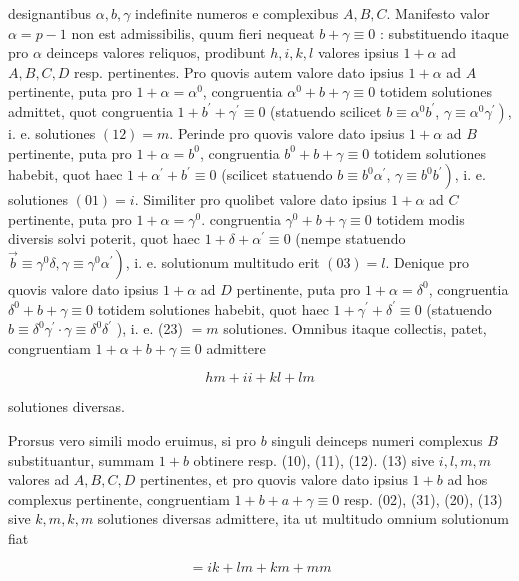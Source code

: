 \documentclass[10pt]{article}
\begin{document}
designantibus \(\alpha, b, \gamma\) indefinite numeros e complexibus \(A, B, C\). Manifesto valor \(\alpha=p-1\) non est admissibilis, quum fieri nequeat \(b+\gamma \equiv 0\) : substituendo itaque pro \(\alpha\) deinceps valores reliquos, prodibunt \(h, i, k, l\) valores ipsius \(1+\alpha\) ad \(A, B, C, D\) resp. pertinentes. Pro quovis autem valore dato ipsius \(1+\alpha\) ad \(A\) pertinente, puta pro \(1+\alpha=\alpha^{0}\), congruentia \(\alpha^{0}+b+\gamma \equiv 0\) totidem solutiones admittet, quot congruentia \(1+b^{\prime}+\gamma^{\prime} \equiv 0\) (statuendo scilicet \(b \equiv \alpha^{0} b^{\prime}\), \(\left.\gamma \equiv \alpha^{0} \gamma^{\prime}\right)\), i. e. solutiones \((12)=m\). Perinde pro quovis valore dato ipsius \(1+\alpha\) ad \(B\) pertinente, puta pro \(1+\alpha=b^{0}\), congruentia \(b^{0}+b+\gamma \equiv 0\) totidem solutiones habebit, quot haec \(1+\alpha^{\prime}+b^{\prime} \equiv 0\) (scilicet statuendo \(b \equiv b^{0} \alpha^{\prime}\), \(\left.\gamma \equiv b^{0} b^{\prime}\right)\), i. e. solutiones \((01)=i\). Similiter pro quolibet valore dato ipsius \(1+\alpha\) ad \(C\) pertinente, puta pro \(1+\alpha=\gamma^{0}\). congruentia \(\gamma^{0}+b+\gamma \equiv 0\) totidem modis diversis solvi poterit, quot haec \(1+\delta+\alpha^{\prime} \equiv 0\) (nempe statuendo \(\left.\vec{b} \equiv \gamma^{0} \delta, \gamma \equiv \gamma^{0} \alpha^{\prime}\right)\), i. e. solutionum multitudo erit \((03)=l\). Denique pro quovis valore dato ipsius \(1+\alpha\) ad \(D\) pertinente, puta pro \(1+\alpha=\delta^{0}\), congruentia \(\delta^{0}+b+\gamma \equiv 0\) totidem solutiones habebit, quot haec \(1+\gamma^{\prime}+\delta^{\prime} \equiv 0\) (statuendo \(b \equiv \delta^{0} \gamma^{\prime} \cdot \gamma \equiv \delta^{0} \delta^{\prime}\) ), i. e. (23) \(=m\) solutiones. Omnibus itaque collectis, patet, congruentiam \(1+\alpha+b+\gamma \equiv 0\) admittere

\[
h m+i i+k l+l m
\]

solutiones diversas.

Prorsus vero simili modo eruimus, si pro \(b\) singuli deinceps numeri complexus \(B\) substituantur, summam \(1+b\) obtinere resp. (10), (11), (12). (13) sive \(i, l, m, m\) valores ad \(A, B, C, D\) pertinentes, et pro quovis valore dato ipsius \(1+b\) ad hos complexus pertinente, congruentiam \(1+b+a+\gamma \equiv 0\) resp. (02), (31), (20), (13) sive \(k, m, k, m\) solutiones diversas admittere, ita ut multitudo omnium solutionum fiat

\[
=i k+l m+k m+m m
\]
\end{document}
